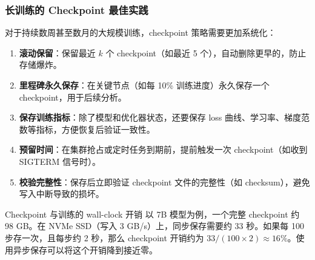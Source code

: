 \subsubsection{长训练的 Checkpoint 最佳实践}

对于持续数周甚至数月的大规模训练，checkpoint 策略需要更加系统化：

\begin{enumerate}
    \item \textbf{滚动保留}：保留最近 $k$ 个 checkpoint（如最近 5 个），自动删除更早的，防止存储爆炸。
    \item \textbf{里程碑永久保存}：在关键节点（如每 10\% 训练进度）永久保存一个 checkpoint，用于后续分析。
    \item \textbf{保存训练指标}：除了模型和优化器状态，还要保存 loss 曲线、学习率、梯度范数等指标，方便恢复后验证一致性。
    \item \textbf{预留时间}：在集群抢占或定时任务到期前，提前触发一次 checkpoint（如收到 SIGTERM 信号时）。
    \item \textbf{校验完整性}：保存后立即验证 checkpoint 文件的完整性（如 checksum），避免写入中断导致的损坏。
\end{enumerate}

\begin{knowledgebox}{Checkpoint 与训练的 wall-clock 开销}
以 7B 模型为例，一个完整 checkpoint 约 98 GB。在 NVMe SSD（写入 3 GB/s）上，同步保存需要约 33 秒。如果每 100 步存一次，且每步约 2 秒，那么 checkpoint 开销约为 $33 / (100 \times 2) \approx 16\%$。使用异步保存可以将这个开销降到接近零。
\end{knowledgebox}

